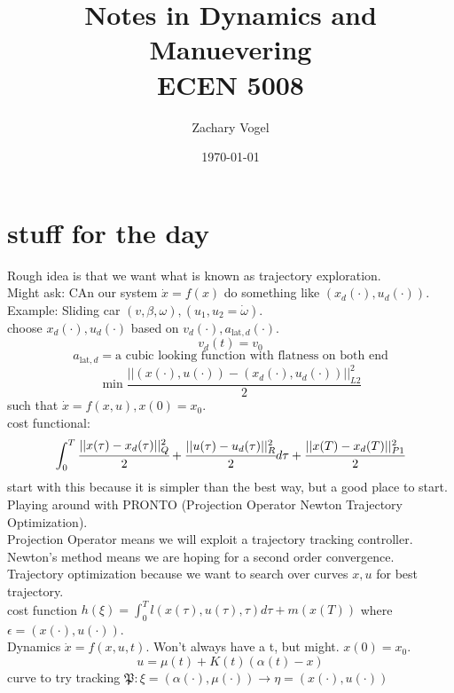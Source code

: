 \documentclass{article}
\author{Zachary Vogel}
\title{Notes in Dynamics and Manuevering\\ ECEN 5008}
\date{\today}
\begin{document}
\maketitle
\section{stuff for the day}
Rough idea is that we want what is known as trajectory exploration.\\
Might ask: CAn our system $\dot{x}=f(x)$ do something like $(x_d(\cdot),u_d(\cdot))$.\\
Example: Sliding car $(v,\beta,\omega),(u_1,u_2=\dot{\omega})$.\\
choose $x_d(\cdot),u_d(\cdot)$ based on $v_d(\cdot),a_{\text{lat},d}(\cdot)$.\\
\[v_d(t)=v_0\]
\[a_{\text{lat},d}=\text{a cubic looking function with flatness on both end}\]
\[\min\frac{\lvert\lvert (x(\cdot),u(\cdot))-(x_d(\cdot),u_d(\cdot))\rvert\rvert_{L2}^2}{2}\]
such that $\dot{x}=f(x,u), x(0)=x_0$.\\
cost functional:
\[\int_0^T\cfrac{\lvert\lvert x(\tau)-x_d(\tau)\rvert\rvert_Q^2}{2}+\cfrac{\lvert\lvert u(\tau)-u_d(\tau)\rvert\rvert^2_R}{2}d\tau+\cfrac{\lvert\lvert x(T)-x_d(T)\rvert\rvert^2_{P1}}{2}\]
start with this because it is simpler than the best way, but a good place to start.\\
Playing around with PRONTO (Projection Operator Newton Trajectory Optimization).\\
Projection Operator means we will exploit a trajectory tracking controller.\\
Newton's method means we are hoping for a second order convergence.\\
Trajectory optimization because we want to search over curves $x,u$ for best trajectory.\\

cost function $h(\xi)=\int_0^Tl(x(\tau),u(\tau),\tau)d\tau+m(x(T))$ where $\epsilon=(x(\cdot),u(\cdot))$.\\
Dynamics $\dot{x}=f(x,u,t)$. Won't always have a t, but might. $x(0)=x_0$.\\
\[u=\mu(t)+K(t)(\alpha(t)-x)\]
curve to try tracking $\mathfrak{P}:\xi=(\alpha(\cdot),\mu(\cdot))\to \eta=(x(\cdot),u(\cdot))$\\
\end{document}
